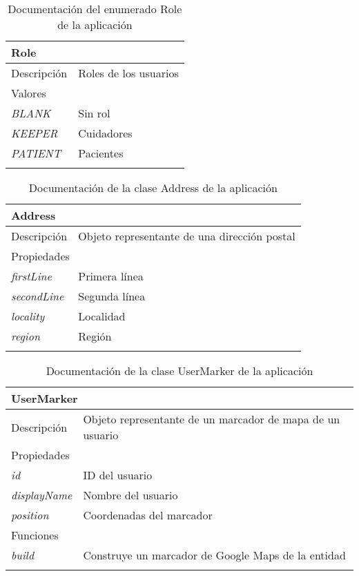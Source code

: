 \begin{longtable}{|p{} p{}|}
    \hline
    \multicolumn{2}{|l|}{\textbf{Role}} \\ \hline \hline
    Descripción      & Roles de los usuarios \\ \hline
    \multicolumn{2}{|l|}{Valores} \\
    \emph{BLANK}  & Sin rol  \\
    \emph{KEEPER}  & Cuidadores  \\
    \emph{PATIENT}  & Pacientes  \\ \hline
    \caption{Documentación del enumerado Role de la aplicación}
    \label{dis:app:role}
\end{longtable}

\begin{longtable}{|p{} p{}|}
    \hline
    \multicolumn{2}{|l|}{\textbf{Address}} \\ \hline \hline
    Descripción      & Objeto representante de una dirección postal \\ \hline
    \multicolumn{2}{|l|}{Propiedades} \\
    \emph{firstLine}  & Primera línea \\
    \emph{secondLine}  & Segunda línea \\
    \emph{locality}  & Localidad \\
    \emph{region}  & Región \\  \hline
    \caption{Documentación de la clase Address de la aplicación}
    \label{dis:app:address}
\end{longtable}

\newpage
\begin{longtable}{|p{} p{}|}
    \hline
    \multicolumn{2}{|l|}{\textbf{UserMarker}} \\ \hline \hline
    Descripción      & Objeto representante de un marcador de mapa de un usuario \\ \hline
    \multicolumn{2}{|l|}{Propiedades} \\
    \emph{id}  & ID del usuario \\
    \emph{displayName}  & Nombre del usuario \\
    \emph{position}  & Coordenadas del marcador \\ \hline
    \multicolumn{2}{|l|}{Funciones} \\
    \emph{build}  & Construye un marcador de Google Maps de la entidad \\ \hline
    \caption{Documentación de la clase UserMarker de la aplicación}
    \label{dis:app:user_marker}
\end{longtable}